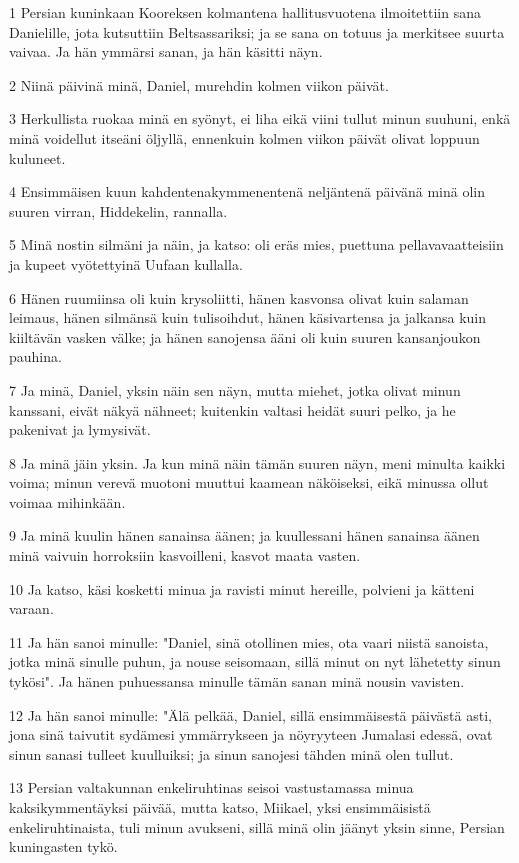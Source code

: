 \par 1 Persian kuninkaan Kooreksen kolmantena hallitusvuotena ilmoitettiin sana Danielille, jota kutsuttiin Beltsassariksi; ja se sana on totuus ja merkitsee suurta vaivaa. Ja hän ymmärsi sanan, ja hän käsitti näyn.
\par 2 Niinä päivinä minä, Daniel, murehdin kolmen viikon päivät.
\par 3 Herkullista ruokaa minä en syönyt, ei liha eikä viini tullut minun suuhuni, enkä minä voidellut itseäni öljyllä, ennenkuin kolmen viikon päivät olivat loppuun kuluneet.
\par 4 Ensimmäisen kuun kahdentenakymmenentenä neljäntenä päivänä minä olin suuren virran, Hiddekelin, rannalla.
\par 5 Minä nostin silmäni ja näin, ja katso: oli eräs mies, puettuna pellavavaatteisiin ja kupeet vyötettyinä Uufaan kullalla.
\par 6 Hänen ruumiinsa oli kuin krysoliitti, hänen kasvonsa olivat kuin salaman leimaus, hänen silmänsä kuin tulisoihdut, hänen käsivartensa ja jalkansa kuin kiiltävän vasken välke; ja hänen sanojensa ääni oli kuin suuren kansanjoukon pauhina.
\par 7 Ja minä, Daniel, yksin näin sen näyn, mutta miehet, jotka olivat minun kanssani, eivät näkyä nähneet; kuitenkin valtasi heidät suuri pelko, ja he pakenivat ja lymysivät.
\par 8 Ja minä jäin yksin. Ja kun minä näin tämän suuren näyn, meni minulta kaikki voima; minun verevä muotoni muuttui kaamean näköiseksi, eikä minussa ollut voimaa mihinkään.
\par 9 Ja minä kuulin hänen sanainsa äänen; ja kuullessani hänen sanainsa äänen minä vaivuin horroksiin kasvoilleni, kasvot maata vasten.
\par 10 Ja katso, käsi kosketti minua ja ravisti minut hereille, polvieni ja kätteni varaan.
\par 11 Ja hän sanoi minulle: "Daniel, sinä otollinen mies, ota vaari niistä sanoista, jotka minä sinulle puhun, ja nouse seisomaan, sillä minut on nyt lähetetty sinun tykösi". Ja hänen puhuessansa minulle tämän sanan minä nousin vavisten.
\par 12 Ja hän sanoi minulle: "Älä pelkää, Daniel, sillä ensimmäisestä päivästä asti, jona sinä taivutit sydämesi ymmärrykseen ja nöyryyteen Jumalasi edessä, ovat sinun sanasi tulleet kuulluiksi; ja sinun sanojesi tähden minä olen tullut.
\par 13 Persian valtakunnan enkeliruhtinas seisoi vastustamassa minua kaksikymmentäyksi päivää, mutta katso, Miikael, yksi ensimmäisistä enkeliruhtinaista, tuli minun avukseni, sillä minä olin jäänyt yksin sinne, Persian kuningasten tykö.

